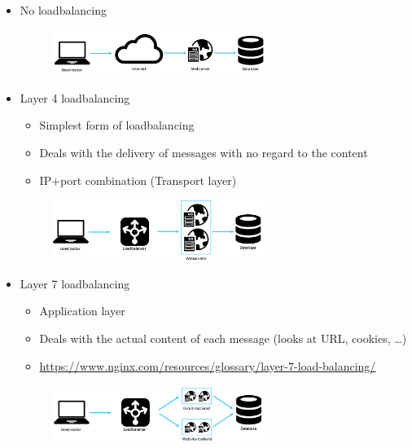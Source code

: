 \documentclass{article}
\begin{document}
\begin{itemize}
    \item No loadbalancing
    \begin{figure}[H]
        \centering
        \includegraphics[width=0.65\textwidth]{loadbalancing1.png}
    \end{figure}
    \item Layer 4 loadbalancing
    \begin{itemize}
        \item Simplest form of loadbalancing
        \item Deals with the delivery of messages with no regard to the content
        \item IP+port combination (Transport layer)
    \end{itemize}
    \begin{figure}[H]
        \centering
        \includegraphics[width=0.65\textwidth]{loadbalancing2.png}
    \end{figure}
    \item Layer 7 loadbalancing
    \begin{itemize}
        \item Application layer
        \item Deals with the actual content of each message (looks at URL, cookies, \dots)
        \item \url{https://www.nginx.com/resources/glossary/layer-7-load-balancing/}
    \end{itemize}
    \begin{figure}[H]
        \centering
        \includegraphics[width=0.65\textwidth]{loadbalancing3.png}
    \end{figure}
\end{itemize}
\end{document}
